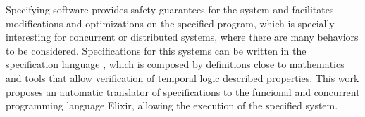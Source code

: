 Specifying software provides safety guarantees for the system and
facilitates modifications and optimizations on the specified program, which is specially interesting for concurrent or distributed systems, where there are many behaviors to be considered. Specifications for this systems can be written in the specification language \TLA, which is composed by definitions close to mathematics and tools that allow verification of temporal logic described properties. This work proposes an automatic translator of \TLA specifications to the funcional and concurrent programming language Elixir, allowing the execution of the specified system.
